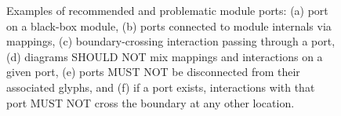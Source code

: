 {\begin{enumerate}
	\begin{figure}[h!]
	\centering
	\caption{Examples of recommended and problematic module ports: (a) port on a black-box module, (b) ports connected to module internals via mappings, (c) boundary-crossing interaction passing through a port, (d) diagrams SHOULD NOT mix mappings and interactions on a given port, (e) ports MUST NOT be disconnected from their associated glyphs, and (f) if a port exists, interactions with that port MUST NOT cross the boundary at any other location.}
	\label{exa:moduleD}
	\end{figure}

\end{enumerate}
}

